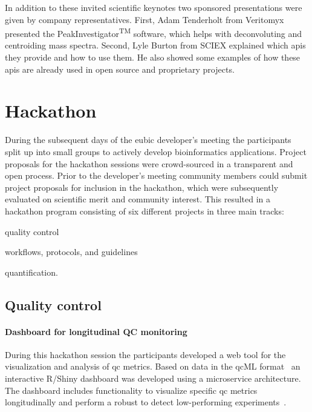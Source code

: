 \documentclass[fontsize=11pt, paper=a4, titlepage=false]{scrartcl}
\begin{document}
In addition to these invited scientific keynotes two sponsored presentations 
were given by company representatives. First, Adam Tenderholt from Veritomyx 
presented the PeakInvestigator\textsuperscript{TM} software, which helps with 
deconvoluting and centroiding mass spectra. Second, Lyle Burton from SCIEX 
explained which \glspl{api} they provide and how to use them. He also showed 
some examples of how these \glspl{api} are already used in open source and 
proprietary projects. 

\section{Hackathon}

During the subsequent days of the \gls{eubic} developer's meeting the 
participants split up into small groups to actively develop bioinformatics 
applications.
Project proposals for the hackathon sessions were crowd-sourced in a 
transparent and open process. Prior to the developer's meeting community 
members could submit project proposals for inclusion in the hackathon, which
were subsequently evaluated on scientific merit and community interest. This 
resulted in a hackathon program consisting of six different projects in three 
main tracks:
\begin{enumerate*}[label=(\roman*),itemjoin={{; }},itemjoin*={{; 
and }},afterlabel=\unskip{{~}}]
\item quality control
\item workflows, protocols, and guidelines
\item quantification.
\end{enumerate*}

\subsection{Quality control}

\paragraph{Dashboard for longitudinal QC monitoring}

During this hackathon session the participants developed a web tool for the 
visualization and analysis of \gls{qc} metrics. Based on data in the qcML 
format~\autocite{Walzer2014} an interactive R/Shiny dashboard  was developed 
using a microservice architecture. The dashboard includes functionality to 
visualize specific \gls{qc} metrics longitudinally and perform a robust 
 to detect low-performing experiments~\autocite{Wang2014}.
\end{document}
